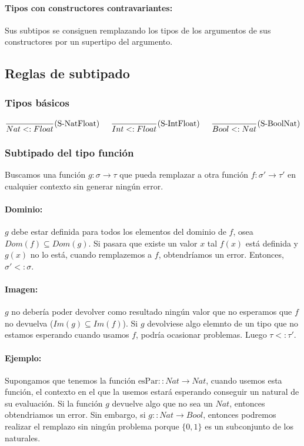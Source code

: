 \paragraph{Tipos con constructores contravariantes:} Sus subtipos se consiguen remplazando los tipos de los argumentos de sus constructores por un supertipo del argumento.


\subsection{Reglas de subtipado}
\subsubsection{Tipos básicos}
\begin{align*}
\frac{}{Nat <: Float}(\text{S-NatFloat}) \hspace*{5mm}\frac{}{Int <: Float}(\text{S-IntFloat}) \hspace*{5mm}\frac{}{Bool <: Nat}(\text{S-BoolNat})
\end{align*}


\subsubsection{Subtipado del tipo función}
Buscamos una función $g:\sigma\to\tau$ que pueda remplazar a otra función $f:\sigma'\to\tau'$ en cualquier contexto sin generar ningún error.
\paragraph{Dominio:}  $g$ debe estar definida para todos los elementos del dominio de $f$, osea $Dom(f)\subseteq Dom(g)$. Si pasara que existe un valor $x$ tal $f(x)$ está definida y $g(x)$ no lo está, cuando remplazemos a $f$, obtendríamos un error. Entonces, $\sigma' <: \sigma$.

\paragraph{Imagen:} $g$ no debería poder devolver como resultado ningún valor que no esperamos que $f$ no devuelva ($Im(g)\subseteq Im(f)$). Si $g$ devolviese algo elemnto de un tipo que no estamos esperando cuando usamos $f$, podría ocasionar problemas. Luego $\tau <: \tau'$.

\paragraph{Ejemplo:} Supongamos que tenemos la función $\text{esPar} :: Nat\to Nat$, cuando usemos esta función, el contexto en el que la usemos estará esperando conseguir un natural de su evaluación. Si la función $g$ devuelve algo que no sea un $Nat$, entonces obtendriamos un error. Sin embargo, si $g :: Nat\to Bool$, entonces podremos realizar el remplazo sin ningún problema porque $\{0,1\}$ es un subconjunto de los naturales. 

